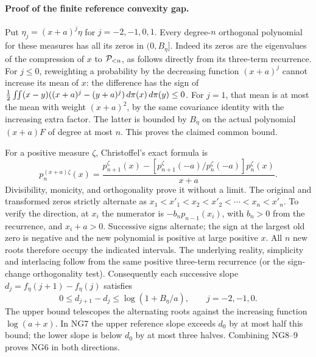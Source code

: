 \paragraph{Proof of the finite reference convexity gap.}
Put $\eta_j=(x+a)^j\eta$ for $j=-2,-1,0,1$.
Every degree-$n$ orthogonal polynomial for these measures has all its
zeros in $(0,B_\eta]$. Indeed its zeros are the eigenvalues of the
compression of $x$ to $\mathcal P_{<n}$, as follows directly from its three-term
recurrence. For $j\le0$, reweighting a probability by the decreasing
function $(x+a)^j$ cannot increase its mean of $x$: the difference
has the sign of
$\frac12\iint(x-y)((x+a)^j-(y+a)^j)\,d\pi(x)\,d\pi(y)\le0$.
For $j=1$, that mean is at most the mean with weight $(x+a)^2$, by
the same covariance identity with the increasing extra factor. The
latter is bounded by $B_\eta$ on the actual polynomial $(x+a)F$ of
degree at most $n$. This proves the claimed common bound.

For a positive measure $\zeta$, Christoffel's exact formula is
\[
 p_n^{(x+a)\zeta}(x)=
 \frac{p_{n+1}^{\zeta}(x)-
       [p_{n+1}^{\zeta}(-a)/p_n^{\zeta}(-a)]p_n^{\zeta}(x)}{x+a}.
\]
Divisibility, monicity, and orthogonality prove it without a limit.
The original and transformed zeros strictly alternate as
$x_1<x'_1<x_2<x'_2<\cdots<x_n<x'_n$.
To verify the direction, at $x_i$ the numerator is
$-b_n p_{n-1}(x_i)$, with $b_n>0$ from the recurrence, and $x_i+a>0$.
Successive signs alternate; the sign at the largest old zero is
negative and the new polynomial is positive at large positive $x$.
All $n$ new roots therefore occupy the indicated intervals. The
underlying reality, simplicity and interlacing follow from the same
positive three-term recurrence (or the sign-change orthogonality test).
Consequently each successive slope
$d_j=f_\eta(j+1)-f_\eta(j)$ satisfies
\[
 0\le d_{j+1}-d_j\le\log(1+B_\eta/a),\qquad j=-2,-1,0.
\]
The upper bound telescopes the alternating roots against the increasing
function $\log(a+x)$. In NG7 the upper reference slope exceeds $d_0$
by at most half this bound; the lower slope is below $d_0$ by at most
three halves. Combining NG8--9 proves NG6 in both directions.

